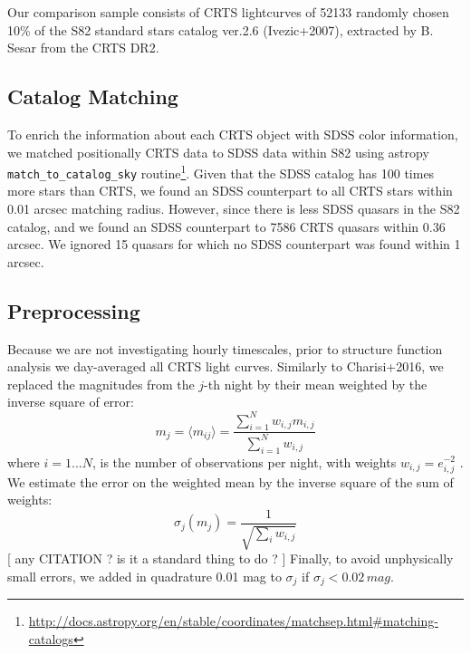\documentclass[fleqn,usenatbib]{mnras}  %
\begin{document}
Our comparison sample consists of CRTS lightcurves of 52133 randomly chosen  10\% of the S82 standard stars catalog ver.2.6 (Ivezic+2007), extracted by B. Sesar from the CRTS DR2.


\subsection{Catalog Matching}
To enrich the information about each CRTS object with SDSS color information, we matched positionally CRTS data to SDSS data within S82 using astropy \verb|match_to_catalog_sky|  routine\footnote{\url{http://docs.astropy.org/en/stable/coordinates/matchsep.html\#matching-catalogs}}.  
Given that the SDSS catalog has 100 times more stars than CRTS, we found an SDSS counterpart to all  CRTS stars within 0.01 arcsec matching radius. However, since there is less SDSS quasars in the S82 catalog, and we found an SDSS counterpart to 7586 CRTS quasars within 0.36 arcsec. We  ignored  15 quasars for which no SDSS counterpart was found within 1 arcsec.  


\subsection{Preprocessing}

Because we are not investigating hourly timescales, prior to structure function analysis we day-averaged all  CRTS light curves. Similarly to  Charisi+2016, we replaced the magnitudes  from the  $j$-th  night by their mean weighted by the inverse square of error:
\begin{equation}
 m_{j} = \langle m_{ij} \rangle = \frac{\sum_{i=1}^{N} {w_{i,j} m_{i,j}} } {\sum_{i=1}^{N} {w_{i,j}} }
\end{equation}
where $i=1...N$, is the number of observations per night, with weights $w_{i,j} = e_{i,j}^{-2}$ .  
We estimate the error on the weighted mean by the inverse square of the sum of weights:  
\begin{equation}
\sigma_{j}(m_{j}) = \frac{1}{\sqrt{\sum_{i}{w_{i,j}}}}
\end{equation}   [ any CITATION ? is it a standard thing to do ? ] Finally, to avoid unphysically small errors, we added in quadrature 0.01 mag  to $\sigma_{j}$ if $\sigma_{j} < 0.02 \,  mag $. 
\end{document}
